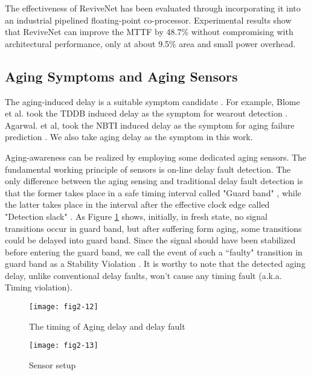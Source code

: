 The effectiveness of ReviveNet has been evaluated through incorporating it into an industrial pipelined floating-point co-processor. Experimental results show that ReviveNet can improve the MTTF by 48.7\% without compromising with architectural performance, only at about 9.5\% area and small power overhead.


\subsection{Aging Symptoms and Aging Sensors}
The aging-induced delay is a suitable symptom candidate \cite{Self-calibrating_07} \cite{agarwal2007circuit} \cite{failure_prediction2_08}. For example, Blome et al. took the TDDB induced delay as the symptom for wearout detection \cite{Self-calibrating_07}. Agarwal. et al, took the NBTI induced delay as the symptom for aging failure prediction \cite{agarwal2007circuit}\cite{failure_prediction2_08}. We also take aging delay as the symptom in this work.

Aging-awareness can be realized by employing some dedicated aging sensors. The fundamental working principle of sensors is on-line delay fault detection. The only difference between the aging sensing and traditional delay fault detection is that the former takes place in a safe timing interval called "Guard band" \cite{agarwal2007circuit}, while the latter takes place in the interval after the effective clock edge called "Detection slack" \cite{SVFD_09}. As Figure \ref{agingdelay} shows, initially, in fresh state, no signal transitions occur in guard band, but after suffering form aging, some transitions could be delayed into guard band. Since the signal should have been stabilized before entering the guard band, we call the event of such a ``faulty" transition in guard band as a Stability Violation \cite{SVFD_09}. It is worthy to note that the detected aging delay, unlike conventional delay faults, won't cause any timing fault (a.k.a. Timing violation).

\begin{figure}[t]
\centering
\texttt{[image: fig2-12]}%
   \caption{The timing of Aging delay and delay fault}\label{agingdelay}
\end{figure}

\begin{figure}[t]
\centering
\texttt{[image: fig2-13]}%
\vspace{-0.5cm}
   \caption{Sensor setup}\label{setupsonsor}
\end{figure}

